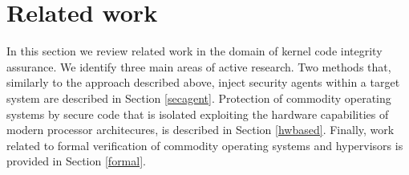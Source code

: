 



\clearpage

\section{Related work}\label{hf:related}
In this section we review related work in the domain of kernel code integrity assurance. We identify three main areas of active research. Two methods that, similarly to the approach described above, inject security agents within a target system are described in Section \ref{secagent}. Protection of commodity operating systems by secure code that is isolated exploiting the hardware capabilities of modern processor architecures, is described in Section \ref{hwbased}. Finally, work related to formal verification of commodity operating systems and hypervisors is provided in Section \ref{formal}.


%



